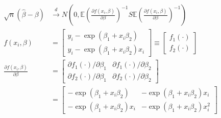 {{\begin{enumerate}[label=(\arabic*)]
{$$
\begin{aligned}
\sqrt{n}(\hat{\beta}-\beta) & \xrightarrow{d} N\left(0, \mathbb{E}\left(\frac{\partial f\left(x_{i}, \beta\right)}{\partial \beta}\right)^{-1} S \mathbb{E}\left(\frac{\partial f\left(x_{i}, \beta\right)}{\partial \beta}\right)^{-1}\right) \\
f\left(x_{i}, \beta\right) & =\left[\begin{array}{ll}
y_{i}-\exp \left(\beta_{1}+x_{i} \beta_{2}\right) \\
y_{i}-\exp \left(\beta_{1}+x_{i} \beta_{2}\right) x_{i}
\end{array}\right] \equiv\left[\begin{array}{l}
f_{1}(\cdot) \\
f_{2}(\cdot)
\end{array}\right] \\
\frac{\partial f\left(x_{i}, \beta\right)}{\partial \beta} & =\left[\begin{array}{ll}
\partial f_{1}(\cdot) / \partial \beta_{1} & \partial f_{1}(\cdot) / \partial \beta_{2} \\
\partial f_{2}(\cdot) / \partial \beta_{1} & \partial f_{2}(\cdot) / \partial \beta_{2}
\end{array}\right] \\
& =\left[\begin{array}{ll}
-\exp \left(\beta_{1}+x_{i} \beta_{2}\right) & -\exp \left(\beta_{1}+x_{i} \beta_{2}\right) x_{i} \\
-\exp \left(\beta_{1}+x_{i} \beta_{2}\right) x_{i} & -\exp \left(\beta_{1}+x_{i} \beta_{2}\right) x_{i}^{2}
\end{array}\right]
\end{aligned}
$$

}
\end{enumerate}}}
